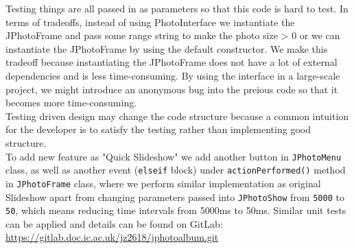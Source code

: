 \documentclass[10pt]{article}
\begin{document}
Testing things are all passed in as parameters so that this code is hard to test. In terms of  tradeoffs, instead of using PhotoInterface we instantiate the JPhotoFrame and pass some range string to make the photo size > 0 or we can instantiate the JPhotoFrame by using the default constructor. We make this tradeoff because instantiating the JPhotoFrame does not have a lot of external dependencies and is less time-consuming. By using the interface in a large-scale project,  we might introduce an anonymous bug into the preious code so that it becomes more time-consuming.\\
Testing driven design may change the code structure because a common intuition for the developer is to satisfy the testing rather than implementing good structure. \\[10px]
To add new feature as "Quick Slideshow" we add another button in \texttt{JPhotoMenu} class, as well as another event (\texttt{elseif} block) under \texttt{actionPerformed()} method in \texttt{JPhotoFrame} class, where we perform similar implementation as original Slideshow apart from changing parameters passed into 
\texttt{JPhotoShow} from \texttt{5000} to \texttt{50}, which means reducing time intervals from 5000ms to 50ms. Similar unit tests can be applied and details can be found on GitLab: \\
\href{https://gitlab.doc.ic.ac.uk/jz2618/jphotoalbum.git}{https://gitlab.doc.ic.ac.uk/jz2618/jphotoalbum.git} \\[10px]
\end{document}
